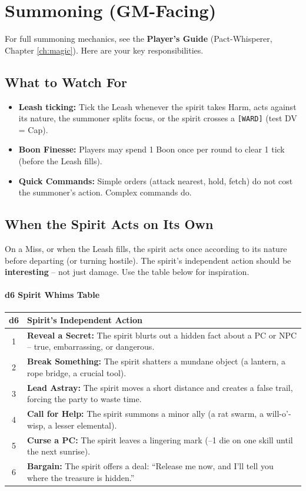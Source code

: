 \section{Summoning (GM-Facing)}
\label{sec:summoning-gm}

For full summoning mechanics, see the \textbf{Player's Guide} (Pact-Whisperer, Chapter \ref{ch:magic}). Here are your key responsibilities.

\subsection*{What to Watch For}
\begin{itemize}
  \item \textbf{Leash ticking:} Tick the Leash whenever the spirit takes Harm, acts against its nature, the summoner splits focus, or the spirit crosses a \texttt{[WARD]} (test DV = Cap).
  \item \textbf{Boon Finesse:} Players may spend 1 Boon once per round to clear 1 tick (before the Leash fills).
  \item \textbf{Quick Commands:} Simple orders (attack nearest, hold, fetch) do not cost the summoner's action. Complex commands do.
\end{itemize}

\subsection*{When the Spirit Acts on Its Own}
On a Miss, or when the Leash fills, the spirit acts once according to its nature before departing (or turning hostile). The spirit's independent action should be \textbf{interesting} -- not just damage. Use the table below for inspiration.

\paragraph{d6 Spirit Whims Table}
\label{subsec:spirit-whims}
\begin{center}
\begin{tabular}{cl}
\toprule
\textbf{d6} & \textbf{Spirit's Independent Action} \\
\midrule
1 & \textbf{Reveal a Secret:} The spirit blurts out a hidden fact about a PC or NPC -- true, embarrassing, or dangerous. \\
2 & \textbf{Break Something:} The spirit shatters a mundane object (a lantern, a rope bridge, a crucial tool). \\
3 & \textbf{Lead Astray:} The spirit moves a short distance and creates a false trail, forcing the party to waste time. \\
4 & \textbf{Call for Help:} The spirit summons a minor ally (a rat swarm, a will-o'-wisp, a lesser elemental). \\
5 & \textbf{Curse a PC:} The spirit leaves a lingering mark (--1 die on one skill until the next sunrise). \\
6 & \textbf{Bargain:} The spirit offers a deal: ``Release me now, and I'll tell you where the treasure is hidden.'' \\
\bottomrule
\end{tabular}
\end{center}

